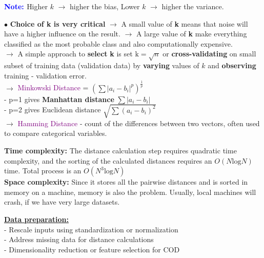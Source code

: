 \documentclass[letterpaper, 10.5pt,landscape]{article}
\begin{document}
\begin{multicols*}{3}
\textbf{\textcolor{blue}{Note: }} Higher $k$ $\rightarrow$ higher the bias, Lower $k$ $\rightarrow$ higher the variance.

$\bullet$ \textbf{Choice of \textbf{k} is very critical} $\rightarrow$ A small value of \textbf{k} means that noise will have a higher influence on the result. 
$\rightarrow$ A large value of \textbf{k} make everything classified as the most probable class and also computationally expensive.\\

$\rightarrow$ A simple approach to \textbf{select} \textbf{k} is set $\boxed{\text{k} = \sqrt{n}}$ or \textbf{cross-validating} on small subset of training data (validation data) by \textbf{varying} values of $k$ and \textbf{observing} training - validation error. \\

$\rightarrow$ \textcolor{purple}{Minkowski Distance} = \(\boxed{\left(\sum| a_{i} - b_{i}|^{p}\right)^{\frac{1}{p}}} \) \\
\hspace{10pt} - p=1 gives \textbf{Manhattan distance} \(\boxed{\sum|a_{i} - b_{i}|} \)  \\
\hspace{10pt} - p=2 gives Euclidean distance \(\boxed{\sqrt{\sum(a_{i} - b_{i})^{2}}} \)\\

\vspace{2pt}
$\rightarrow$ \textcolor{purple}{Hamming Distance} - count of the differences between two vectors, often used to compare categorical variables.




 
\textbf{Time complexity:}
The distance calculation step requires quadratic time complexity, and the sorting of the calculated distances requires an \(O(N \text{log} N)\) time. Total process is an \(O(N^{3} \text{log} N)\)  \\
\vspace{2pt}
\textbf{Space complexity:}
Since it stores all the pairwise distances and is sorted in memory on a machine, memory is also the problem. Usually, local machines will crash, if we have very large datasets.

 
 \vspace{3pt}
 \textbf{\underline{Data preparation:}} \\
- Rescale inputs using standardization or normalization \\
- Address missing data for distance calculations \\
- Dimensionality reduction or feature selection for COD



\end{multicols*}
\end{document}

